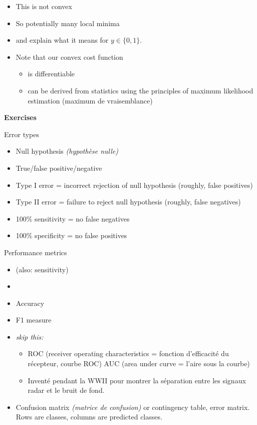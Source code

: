 \begin{itemize}
\item This is not convex
\item So potentially many local minima
\item {} and explain what it means for $y\in\{0,1\}$.
\item Note that our convex cost function
  \begin{itemize}
  \item is differentiable
  \item can be derived from statistics using the principles of maximum
    likelihood estimation (maximum de vraisemblance)
  \end{itemize}
\end{itemize}

\textbf{Exercises}

Error types
\begin{itemize}
\item Null hypothesis \textit{(hypothèse nulle)}
\item True/false positive/negative
\item Type I error = incorrect rejection of null hypothesis (roughly, false positives)
\item Type II error = failure to reject null hypothesis (roughly, false negatives)
\item 100\% sensitivity = no false negatives
\item 100\% specificity = no false positives
\end{itemize}


Performance metrics
\begin{itemize}
\item {} (also: sensitivity)
\item {}
\item Accuracy
\item F1 measure
\item \textit{skip this:}
  \begin{itemize}
  \item ROC (receiver operating characteristics = fonction
    d’efficacité du récepteur, courbe ROC) AUC (area under curve =
    l'aire sous la courbe)
  \item Inventé pendant la WWII pour montrer la séparation entre les
    signaux radar et le bruit de fond.
  \end{itemize}
\item Confusion matrix \textit{(matrice de confusion)} or contingency
  table, error matrix. Rows are classes, columns are predicted
  classes.
\end{itemize}

